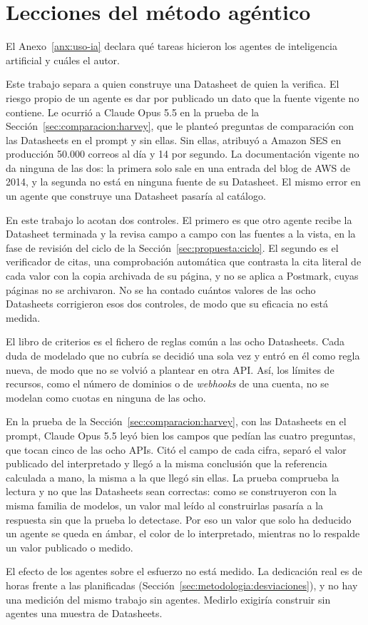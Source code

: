 \section{Lecciones del método agéntico}
\label{sec:conclusiones:lecciones}

El Anexo~\ref{anx:uso-ia} declara qué tareas hicieron los agentes de inteligencia artificial y cuáles el autor.

Este trabajo separa a quien construye una Datasheet de quien la verifica.
El riesgo propio de un agente es dar por publicado un dato que la fuente vigente no contiene.
Le ocurrió a Claude Opus 5.5 en la prueba de la Sección~\ref{sec:comparacion:harvey}, que le planteó preguntas de comparación con las Datasheets en el prompt y sin ellas.
Sin ellas, atribuyó a Amazon SES en producción 50.000 correos al día y 14 por segundo.
La documentación vigente no da ninguna de las dos: la primera solo sale en una entrada del blog de AWS de 2014, y la segunda no está en ninguna fuente de su Datasheet.
El mismo error en un agente que construye una Datasheet pasaría al catálogo.

En este trabajo lo acotan dos controles.
El primero es que otro agente recibe la Datasheet terminada y la revisa campo a campo con las fuentes a la vista, en la fase de revisión del ciclo de la Sección~\ref{sec:propuesta:ciclo}.
El segundo es el verificador de citas, una comprobación automática que contrasta la cita literal de cada valor con la copia archivada de su página, y no se aplica a Postmark, cuyas páginas no se archivaron.
No se ha contado cuántos valores de las ocho Datasheets corrigieron esos dos controles, de modo que su eficacia no está medida.

El libro de criterios es el fichero de reglas común a las ocho Datasheets.
Cada duda de modelado que no cubría se decidió una sola vez y entró en él como regla nueva, de modo que no se volvió a plantear en otra API.
Así, los límites de recursos, como el número de dominios o de \textit{webhooks} de una cuenta, no se modelan como cuotas en ninguna de las ocho.

En la prueba de la Sección~\ref{sec:comparacion:harvey}, con las Datasheets en el prompt, Claude Opus 5.5 leyó bien los campos que pedían las cuatro preguntas, que tocan cinco de las ocho APIs.
Citó el campo de cada cifra, separó el valor publicado del interpretado y llegó a la misma conclusión que la referencia calculada a mano, la misma a la que llegó sin ellas.
La prueba comprueba la lectura y no que las Datasheets sean correctas: como se construyeron con la misma familia de modelos, un valor mal leído al construirlas pasaría a la respuesta sin que la prueba lo detectase.
Por eso un valor que solo ha deducido un agente se queda en ámbar, el color de lo interpretado, mientras no lo respalde un valor publicado o medido.

El efecto de los agentes sobre el esfuerzo no está medido.
La dedicación real es de  horas frente a las  planificadas (Sección~\ref{sec:metodologia:desviaciones}), y no hay una medición del mismo trabajo sin agentes.
Medirlo exigiría construir sin agentes una muestra de Datasheets.
